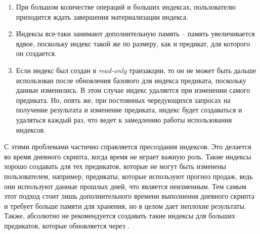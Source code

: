 \begin{enumerate}
  \item При большом количестве операций \join и больших индексах, пользователю приходится ждать завершения материализации индекса.
  \item Индексы все-таки занимают дополнительную память – память увеличивается вдвое, поскольку индекс такой же по размеру, как и предикат, для которого он создается.
  \item Если индекс был создан в \emph{read-only} транзакции, то он не может быть дальше использован после обновления базового для индекса предиката, поскольку данные изменились. В этом случае индекс удаляется при изменении самого предиката. Но, опять же, при постоянных чередующихся запросах на получение результата и изменение предиката, индекс будет создаваться и удаляться каждый раз, что ведет к замедлению работы использования индексов.
\end{enumerate}

С этими проблемами частично справляется пресоздания индексов. Это делается во время дневного скрипта, когда время не играет важную роль. Такие индексы хорошо создавать для тех предикатов, которые не могут быть изменены пользователем, например, предикаты, которые используют прогноз продаж, ведь они используют данные прошлых дней, что является неизменным. Тем самым этот подход стоит лишь дополнительного времени выполнения дневного скрипта и требует больше памяти для хранения, но в целом дает неплохие результаты. Также, абсолютно не рекомендуется создавать такие индексы для больших предикатов, которые обновляется через \ui.

